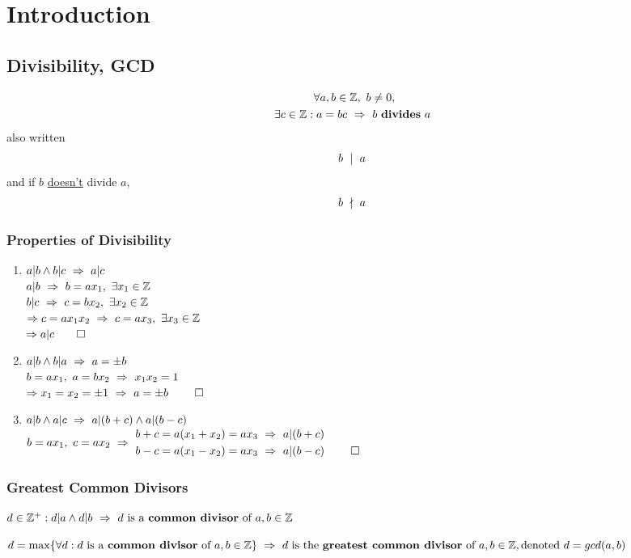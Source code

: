\chapter{Introduction}
\section{Divisibility, GCD}
\begin{definition}[Divisibility]
  \begin{gather*}
    \forall a,b \in \mathbb{Z}, \ b \ne 0,	\\
    \exists c \in \mathbb{Z} : a=bc \ \Rightarrow \  b \ \textbf{divides} \ a \ 
  \end{gather*}
  also written \[b \ \mid \ a \ \]
  and if $b$ \underline{doesn't} divide $a$, \[b \ \nmid \ a \ \]
\end{definition}
\subsection{Properties of Divisibility}
\begin{enumerate}
  \item
        $a|b \wedge b|c \ \Rightarrow \  a|c \ $	\\
        $a|b \ \Rightarrow \  b=ax_1, \ \exists x_1 \in \mathbb{Z} \ $	\\
        $b|c \ \Rightarrow \  c=bx_2, \ \exists x_2 \in \mathbb{Z} \ $	\\
        $\Rightarrow \ifthen{c=ax_1x_2}{c=ax_3, \ \exists x_3 \in \Z}$	\\
        $\Rightarrow a|c \qed$
  \item
        $a|b \wedge b|a \ \Rightarrow \  a=\pm b \ $	\\
        $\ifthen{b=ax_1, \ a=bx_2}{x_1x_2=1}$	\\
        $\Rightarrow x_1=x_2=\pm 1 \ \Rightarrow \  a=\pm b \  \qed$
  \item
        $a|b \wedge a|c \ \Rightarrow \  a|(b+c) \wedge a|(b-c) \ $  \\
        $b=ax_1, \ c=ax_2 \ \Rightarrow \  
            \begin{aligned}
              b+c & = a(x_1+x_2) = ax_3 \ \Rightarrow \  a|(b+c) \       \\
              b-c & = a(x_1-x_2) = ax_3 \ \Rightarrow \  a|(b-c) \  \qed
            \end{aligned}
           \ $
\end{enumerate}
\subsection{Greatest Common Divisors}
\begin{definition}
  $\ifthen{d \in \Z^+ : d|a \wedge d|b}{d \ \text{is a \textbf{common divisor} of} \ a,b \in \Z}$
\end{definition}
\begin{definition}
  $\ifthen{d = \max \{\forall d : d \ \text{is a \textbf{common divisor} of} \ a,b \in \Z\} \\}{d \ \text{is the \textbf{greatest common divisor} of} \ a,b \in \Z, \text{denoted} \ d=gcd(a,b)}$
\end{definition}
